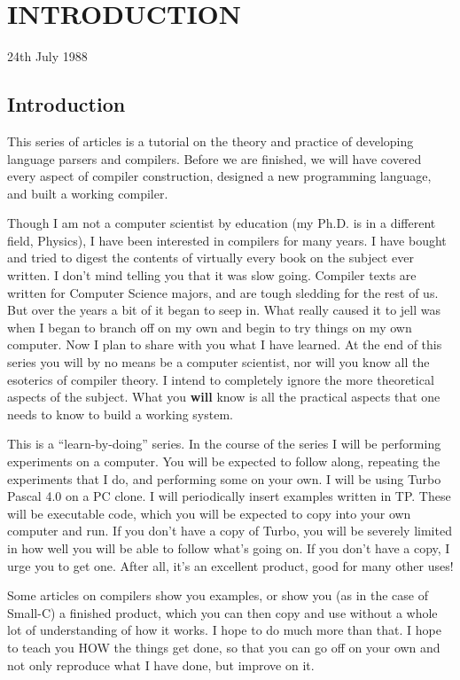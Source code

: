 
\chapter{INTRODUCTION}

24th July 1988

\section{Introduction}


This series of articles is a tutorial on the theory  and practice
of  developing language parsers and compilers.    Before  we  are
finished,  we  will  have  covered  every   aspect   of  compiler
construction, designed a new programming  language,  and  built a
working compiler.

Though I am not a computer scientist by education (my Ph.D. is in
a different  field, Physics), I have been interested in compilers
for many years.  I have  bought  and tried to digest the contents
of virtually every  book  on  the  subject ever written.  I don't
mind  telling you that it was slow going.  Compiler  texts  are
written for Computer  Science  majors, and are tough sledding for
the rest of us.  But over the years a bit of it began to seep in.
What really caused it to jell was when I began  to  branch off on
my own and begin to try things on my own computer.  Now I plan to
share with you what I have  learned.    At the end of this series
you will by no means be  a  computer scientist, nor will you know
all the esoterics of  compiler  theory.    I intend to completely
ignore the more theoretical  aspects  of  the  subject.  What you
{\bf will} know is all  the  practical aspects that one needs to know
to build a working system.

This is a ``learn-by-doing'' series.  In the course of the series I
will be performing  experiments  on  a  computer.    You  will be
expected to follow along,  repeating  the  experiments that I do,
and  performing  some  on your own.  I will be using Turbo Pascal
4.0 on a PC  clone.   I will periodically insert examples written
in TP.  These will be executable code, which you will be expected
to copy into your own computer and run.  If you don't have a copy
of  Turbo,  you  will be severely limited in how well you will be
able to follow what's going on.  If you don't have a copy, I urge
you to get one.  After  all,  it's an excellent product, good for
many other uses!

Some articles on compilers show you examples, or show you  (as in
the case of Small-C) a finished product, which you can  then copy
and  use without a whole lot of understanding of how it works.  I
hope to do much more  than  that.    I  hope to teach you HOW the
things get done,  so that you can go off on your own and not only
reproduce what I have done, but improve on it.


